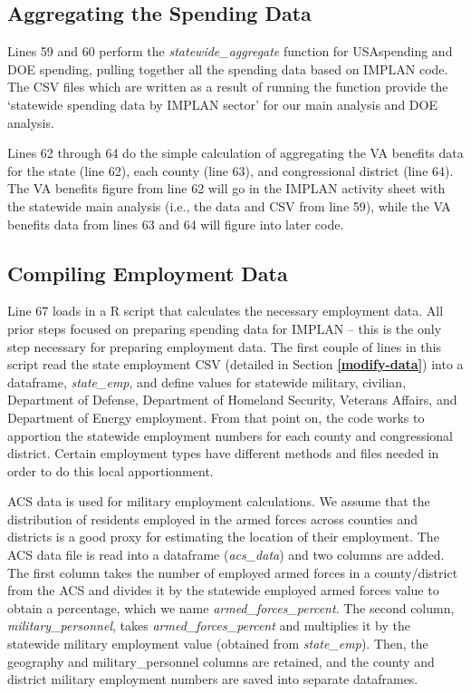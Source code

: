 \documentclass[
]{book}
\begin{document}
\hypertarget{agg-data}{%
\subsection{Aggregating the Spending Data}\label{agg-data}}

Lines 59 and 60 perform the \emph{statewide\_aggregate} function for USAspending and DOE spending, pulling together all the spending data based on IMPLAN code. The CSV files which are written as a result of running the function provide the `statewide spending data by IMPLAN sector' for our main analysis and DOE analysis.

Lines 62 through 64 do the simple calculation of aggregating the VA benefits data for the state (line 62), each county (line 63), and congressional district (line 64). The VA benefits figure from line 62 will go in the IMPLAN activity sheet with the statewide main analysis (i.e., the data and CSV from line 59), while the VA benefits data from lines 63 and 64 will figure into later code.

\hypertarget{compile-emp}{%
\subsection{Compiling Employment Data}\label{compile-emp}}

Line 67 loads in a R script that calculates the necessary employment data. All prior steps focused on preparing spending data for IMPLAN -- this is the only step necessary for preparing employment data. The first couple of lines in this script read the state employment CSV (detailed in Section \textbf{\ref{modify-data}}) into a dataframe, \emph{state\_emp}, and define values for statewide military, civilian, Department of Defense, Department of Homeland Security, Veterans Affairs, and Department of Energy employment. From that point on, the code works to apportion the statewide employment numbers for each county and congressional district. Certain employment types have different methods and files needed in order to do this local apportionment.

ACS data is used for military employment calculations. We assume that the distribution of residents employed in the armed forces across counties and districts is a good proxy for estimating the location of their employment. The ACS data file is read into a dataframe (\emph{acs\_data}) and two columns are added. The first column takes the number of employed armed forces in a county/district from the ACS and divides it by the statewide employed armed forces value to obtain a percentage, which we name \emph{armed\_forces\_percent}. The second column, \emph{military\_personnel}, takes \emph{armed\_forces\_percent} and multiplies it by the statewide military employment value (obtained from \emph{state\_emp}). Then, the geography and military\_personnel columns are retained, and the county and district military employment numbers are saved into separate dataframes.
\end{document}
